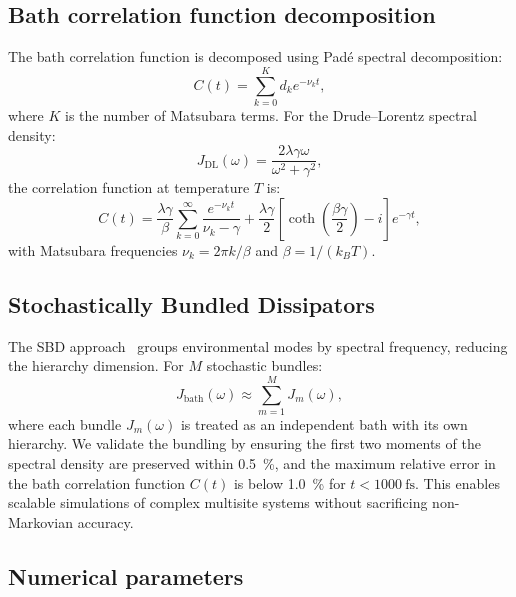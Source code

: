\documentclass[11pt,a4paper]{article}
\begin{document}
\subsection{Bath correlation function decomposition}

The bath correlation function is decomposed using Padé spectral decomposition:
\begin{equation}
C(t) = \sum_{k=0}^{K} d_k e^{-\nu_k t},
\label{eq:SI_bath_correlation}
\end{equation}
where $K$ is the number of Matsubara terms. For the Drude--Lorentz spectral density:
\begin{equation}
J_{\mathrm{DL}}(\omega) = \frac{2\lambda\gamma\omega}{\omega^2 + \gamma^2},
\label{eq:SI_drude_lorentz}
\end{equation}
the correlation function at temperature $T$ is:
\begin{equation}
C(t) = \frac{\lambda\gamma}{\beta}\sum_{k=0}^{\infty} \frac{e^{-\nu_k t}}{\nu_k - \gamma} + \frac{\lambda\gamma}{2}\left[\coth\left(\frac{\beta\gamma}{2}\right) - i\right]e^{-\gamma t},
\label{eq:SI_correlation_DL}
\end{equation}
with Matsubara frequencies $\nu_k = 2\pi k/\beta$ and $\beta = 1/(k_B T)$.

\subsection{Stochastically Bundled Dissipators}

The SBD approach~\cite{Varvelo2021a} groups environmental modes by spectral frequency, reducing the hierarchy dimension. For $M$ stochastic bundles:
\begin{equation}
J_{\mathrm{bath}}(\omega) \approx \sum_{m=1}^{M} J_m(\omega),
\label{eq:SI_sbd}
\end{equation}
where each bundle $J_m(\omega)$ is treated as an independent bath with its own hierarchy. We validate the bundling by ensuring the first two moments of the spectral density are preserved within \SI{0.5}{\percent}, and the maximum relative error in the bath correlation function $C(t)$ is below \SI{1.0}{\percent} for $t < \SI{1000}{\femto\second}$. This enables scalable simulations of complex multisite systems without sacrificing non-Markovian accuracy.

\subsection{Numerical parameters}
\end{document}
